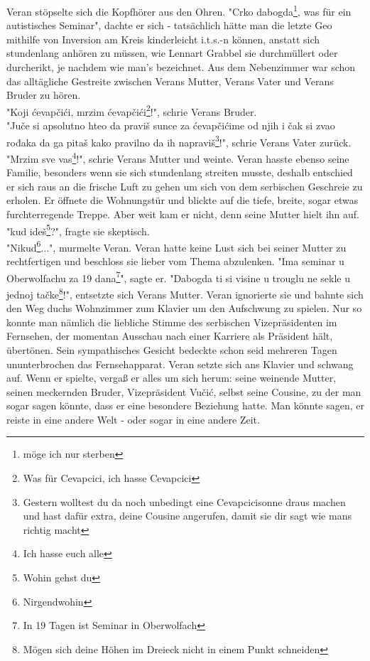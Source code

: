 \documentclass[oneside]{memoir}
\begin{document}
Veran stöpselte sich die Kopfhörer aus den Ohren. "Crko dabogda\footnote{möge ich nur sterben}, was für ein autistisches Seminar", dachte er sich - tatsächlich hätte man die letzte Geo mithilfe von Inversion am Kreis kinderleicht i.t.s.-n können, anstatt sich stundenlang anhören zu müssen, wie Lennart Grabbel sie durchmüllert oder durcherikt, je nachdem wie man's bezeichnet. Aus dem Nebenzimmer war schon das alltägliche Gestreite zwischen Verans Mutter, Verans Vater und Verans Bruder zu hören. \\
"Koji ćevapčići, mrzim ćevapčići\footnote{Was für Cevapcici, ich hasse Cevapcici}!", schrie Verans Bruder. \\
"Juče si apsolutno hteo da praviš sunce za ćevapčićime od njih i čak si zvao rođaka da ga pitaš kako pravilno da ih napraviš\footnote{Gestern wolltest du da noch unbedingt eine Cevapcicisonne draus machen und hast dafür extra, deine Cousine angerufen, damit sie dir sagt wie mans richtig macht}!", schrie Verans Vater zurück. \\
"Mrzim sve vas\footnote{Ich hasse euch alle}!", schrie Verans Mutter und weinte. Veran hasste ebenso seine Familie, besonders wenn sie sich stundenlang streiten musste, deshalb entschied er sich raus an die frische Luft zu gehen um sich von dem serbischen Geschreie zu erholen. Er öffnete die Wohnungstür und blickte auf die tiefe, breite, sogar etwas furchterregende Treppe. Aber weit kam er nicht, denn seine Mutter hielt ihn auf. \\
"kud ideš\footnote{Wohin gehst du}?", fragte sie skeptisch. \\
"Nikud\footnote{Nirgendwohin}...", murmelte Veran. Veran hatte keine Lust sich bei seiner Mutter zu rechtfertigen und beschloss sie lieber vom Thema abzulenken. "Ima seminar u Oberwolfachu za 19 dana\footnote{In 19 Tagen ist Seminar in Oberwolfach}", sagte er. "Dabogda ti si visine u trouglu ne sekle u jednoj tačke\footnote{Mögen sich deine Höhen im Dreieck nicht in einem Punkt schneiden}!", entsetzte sich Verans Mutter. Veran ignorierte sie und bahnte sich den Weg duchs Wohnzimmer zum Klavier um den Aufschwung zu spielen. Nur so konnte man nämlich die liebliche Stimme des serbischen Vizepräsidenten im Fernsehen, der momentan Ausschau nach einer Karriere als Präsident hält, übertönen. Sein sympathisches Gesicht bedeckte schon seid mehreren Tagen ununterbrochen das Fernsehapparat. Veran setzte sich ans Klavier und schwang auf. Wenn er spielte, vergaß er alles um sich herum: seine weinende Mutter, seinen meckernden Bruder, Vizepräsident Vučić, selbst seine Cousine, zu der man sogar sagen könnte, dass er eine besondere Beziehung hatte. Man könnte sagen, er reiste in eine andere Welt - oder sogar in eine andere Zeit.
\end{document}
